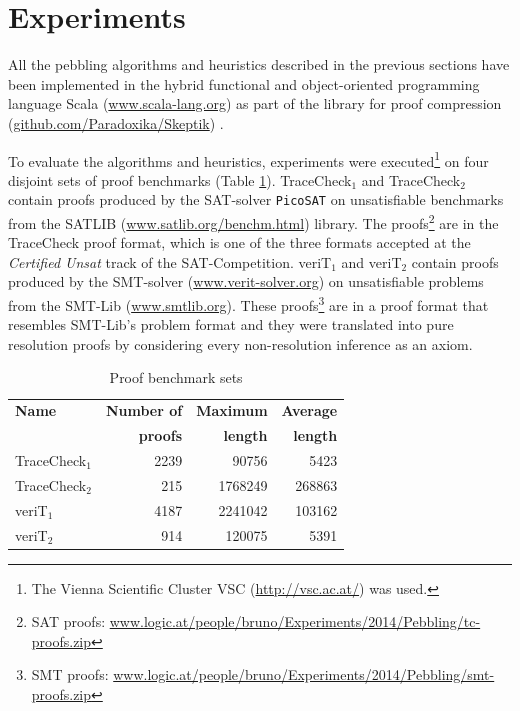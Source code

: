 \section{Experiments} 
\label{sec:experiments}

All the pebbling algorithms and heuristics described in the previous sections have been implemented in the hybrid functional and object-oriented programming
language Scala (\url{www.scala-lang.org}) as part of the \skeptik library for proof compression (\url{github.com/Paradoxika/Skeptik}) \cite{Skeptik}.

To evaluate the algorithms and heuristics, experiments were executed\footnote{The Vienna Scientific Cluster VSC 
(\url{http://vsc.ac.at/}) was used.} on four disjoint sets of proof benchmarks (Table \ref{tab:benchmarks}). 
TraceCheck$_1$ and TraceCheck$_2$ contain proofs produced by the SAT-solver \texttt{PicoSAT} \cite{Biere_picosatessentials} on unsatisfiable benchmarks from the SATLIB (\url{www.satlib.org/benchm.html}) library. 
The proofs\footnote{SAT proofs: \url{www.logic.at/people/bruno/Experiments/2014/Pebbling/tc-proofs.zip}} are in the TraceCheck proof format, which is one of the three formats accepted at the \emph{Certified Unsat} track of the SAT-Competition.
veriT$_1$ and veriT$_2$ contain proofs produced by the SMT-solver {\veriT} (\url{www.verit-solver.org}) on unsatisfiable problems from the SMT-Lib (\url{www.smtlib.org}). 
These proofs\footnote{SMT proofs: \url{www.logic.at/people/bruno/Experiments/2014/Pebbling/smt-proofs.zip}} are in a proof format that resembles SMT-Lib's problem format and they were translated into pure resolution proofs by considering every non-resolution inference as an axiom.


\begin{table}[tb]
	\centering
	\setlength{\tabcolsep}{8pt}
	\begin{tabular}{lrrr}
		\toprule
		\textbf{Name} & \textbf{Number of} & \textbf{Maximum} & \textbf{Average} \\ 
		              & \textbf{proofs}    & \textbf{length}  & \textbf{length} \\
		\midrule
		TraceCheck$_1$ & 2239 & 90756   & 5423   \\
		TraceCheck$_2$ & 215	& 1768249 & 268863 \\
    veriT$_1$ & 4187 & 2241042 & 103162 \\
    veriT$_2$ & 914  & 120075  & 5391  \\ 
		\bottomrule   
	\end{tabular}
	\caption{Proof benchmark sets}
	\label{tab:benchmarks}
\end{table}

